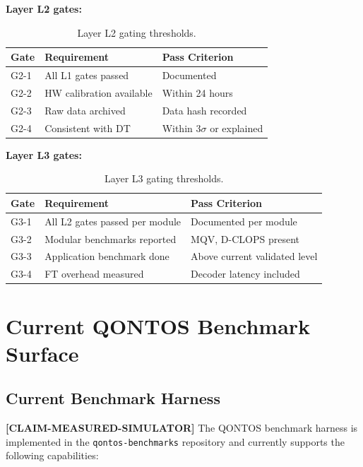 \documentclass[conference]{IEEEtran}
\begin{document}
\textbf{Layer L2 gates:}

\begin{table}[H]
\centering
\caption{Layer L2 gating thresholds.}
\begin{tabular}{@{}l L{3cm} L{3cm}@{}}
\toprule
\textbf{Gate} & \textbf{Requirement} & \textbf{Pass Criterion} \\
\midrule
G2-1 & All L1 gates passed & Documented \\
G2-2 & HW calibration available & Within 24 hours \\
G2-3 & Raw data archived & Data hash recorded \\
G2-4 & Consistent with DT & Within $3\sigma$ or explained \\
\bottomrule
\end{tabular}
\end{table}

\textbf{Layer L3 gates:}

\begin{table}[H]
\centering
\caption{Layer L3 gating thresholds.}
\begin{tabular}{@{}l L{3cm} L{3cm}@{}}
\toprule
\textbf{Gate} & \textbf{Requirement} & \textbf{Pass Criterion} \\
\midrule
G3-1 & All L2 gates passed per module & Documented per module \\
G3-2 & Modular benchmarks reported & MQV, D-CLOPS present \\
G3-3 & Application benchmark done & Above current validated level \\
G3-4 & FT overhead measured & Decoder latency included \\
\bottomrule
\end{tabular}
\end{table}

\section{Current QONTOS Benchmark Surface}

\subsection{Current Benchmark Harness}

\textbf{[CLAIM-MEASURED-SIMULATOR]} The QONTOS benchmark harness is implemented in the \texttt{qontos-benchmarks} repository and currently supports the following capabilities:
\end{document}
